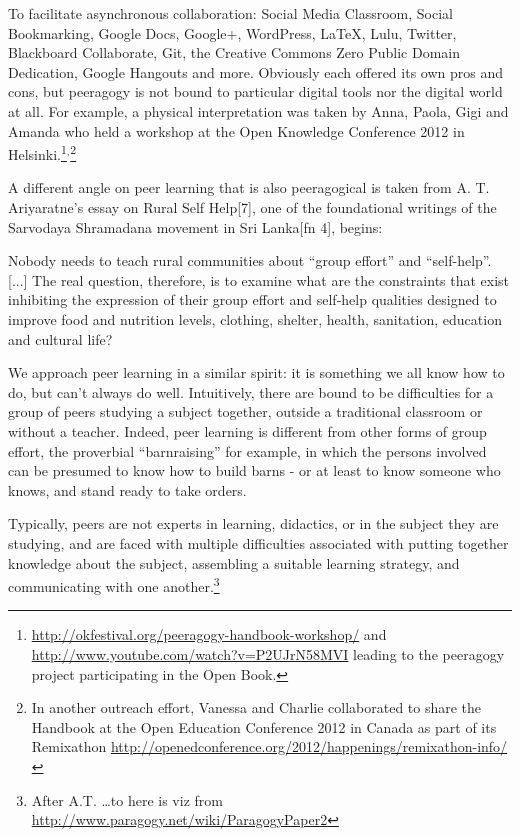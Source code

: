 \documentclass{acm_proc_article-sp}
\begin{document}
To facilitate asynchronous collaboration: Social Media Classroom, Social Bookmarking, Google Docs, Google+, WordPress, LaTeX, Lulu, Twitter, Blackboard Collaborate, Git, the Creative Commons Zero Public Domain Dedication, Google Hangouts and more. Obviously each offered its own pros and cons, but peeragogy is not bound to particular digital tools nor the digital world at all. For example, a physical interpretation was taken by Anna, Paola, Gigi and Amanda who held a workshop at the Open Knowledge Conference 2012 in Helsinki.\footnote{ \url{http://okfestival.org/peeragogy-handbook-workshop/} and \url{http://www.youtube.com/watch?v=P2UJrN58MVI} leading to the peeragogy project participating in the Open Book.}$^{,}$\footnote{In another outreach effort, Vanessa and Charlie collaborated to share the Handbook at the Open Education Conference 2012 in Canada as part of its Remixathon \url{http://openedconference.org/2012/happenings/remixathon-info/}}

A different angle on peer learning that is also peeragogical is taken from A. T. Ariyaratne's essay on Rural Self Help[7], one of the foundational writings of the Sarvodaya Shramadana movement in Sri Lanka[fn 4], begins:

Nobody needs to teach rural communities about ``group effort'' and ``self-help''. [...] The real question, therefore, is to examine what are the constraints that exist inhibiting the expression of their group effort and self-help qualities designed to improve food and nutrition levels, clothing, shelter, health, sanitation, education and cultural life?

We approach peer learning in a similar spirit: it is something we all know how to do, but can't always do well. Intuitively, there are bound to be difficulties for a group of peers studying a subject together, outside a traditional classroom or without a teacher. Indeed, peer learning is different from other forms of group effort, the proverbial ``barnraising'' for example, in which the persons involved can be presumed to know how to build barns - or at least to know someone who knows, and stand ready to take orders.

Typically, peers are not experts in learning, didactics, or in the subject they are studying, and are faced with multiple difficulties associated with putting together knowledge about the subject, assembling a suitable learning strategy, and communicating with one another.\footnote{After A.T. \ldots to here is viz from \url{http://www.paragogy.net/wiki/ParagogyPaper2}}
\end{document}
